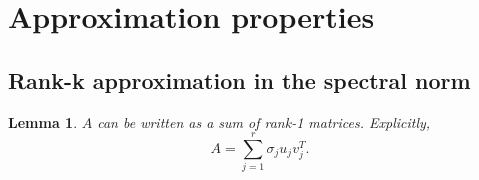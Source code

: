 \documentclass{article}
\newtheorem{lemma}{Lemma}[section]
\newcommand{\norm}[1]{\left \lVert #1 \right \rVert}
\begin{document}

\section{Approximation properties}

\subsection{Rank-k approximation in the spectral norm}

\begin{lemma}\label{rank 1 approx}
$A$ can be written as a sum of rank-1 matrices. Explicitly,
\begin{equation*}
A = \sum_{j=1}^{r} \sigma_{j} u_{j} v_{j}^{T}.
\end{equation*}
\end{lemma}
\end{document}
